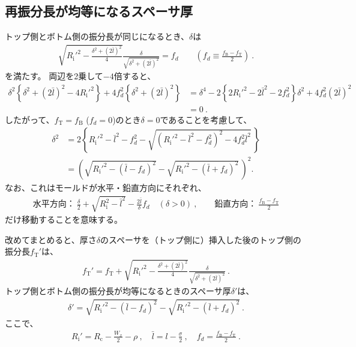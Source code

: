 \subsection{再振分長が均等になるスペーサ厚}
トップ側とボトム側の振分長が同じになるとき、$\delta$は
\begin{align*}
  \sqrt{R_\mathrm i'^2-\frac{\delta^2+(2\bar l)^2}4}\frac\delta{\sqrt{\delta^2+(2\bar l)^2}} = f_d \qquad
  \left(f_d \equiv \frac{f_\mathrm B-f_\mathrm T}2\right)\ .
\end{align*}
を満たす。
両辺を2乗して$-4$倍すると、
\begin{align*}
  \delta^2\left\{\delta^2+(2\bar l)^2-4R_\mathrm i'^2\right\}+4f_d^2\left\{\delta^2+(2\bar l)^2\right\}
  & = \delta^4-2\left\{2R_\mathrm i'^2-2\bar l^2-2f_d^2\right\}\delta^2+4f_d^2(2\bar l)^2\\
  & = 0\ .
\end{align*}
したがって、$f_\mathrm T = f_\mathrm B$ ($f_d = 0$)のとき$\delta = 0$であることを考慮して、
\begin{align*}
  \delta^2
  &= 2\left\{
       R_\mathrm i'^2-\bar l^2-f_d^2-\sqrt{\left(R_\mathrm i'^2-\bar l^2-f_d^2\right)^2-4f_d^2\bar l^2}\,
     \right\}\\
  &= \left(\sqrt{R_\mathrm i'^2-(\bar l-f_d)^2}-\sqrt{R_\mathrm i'^2-(\bar l+f_d)^2}\,\right)^{\!\!2}.
\end{align*}
なお、これはモールドが水平・鉛直方向にそれぞれ、
\begin{align*}
  \text{水平方向：}~\frac\delta2+\sqrt{R_\mathrm i^2-\bar l^2}-\frac{2\bar l}{\delta}f_d\quad(\delta>0)\ , \qquad
  \text{鉛直方向：}~\frac{f_\mathrm B-f_\mathrm T}2
\end{align*}
だけ移動することを意味する。


\begin{hosoku}
改めてまとめると、厚さ$\delta$のスペーサを（トップ側に）挿入した後のトップ側の振分長$f_\mathrm T'$は、
\begin{align*}
  f_\mathrm T'
  = f_\mathrm T+\sqrt{R_\mathrm i'^2-\frac{\delta^2+(2\bar l)^2}4}\frac\delta{\sqrt{\delta^2+(2\bar l)^2}}\ .
\end{align*}
トップ側とボトム側の振分長が均等になるときのスペーサ厚$\delta'$は、
\begin{align*}
  \delta' = \sqrt{R_\mathrm i'^2-(\bar l-f_d)^2}-\sqrt{R_\mathrm i'^2-(\bar l+f_d)^2}\ .
\end{align*}
ここで、
\begin{align*}
  R_\mathrm i' = R_\mathrm c-\frac{W_x}2-\rho\ ,\quad
  \bar l = l-\frac\sigma2\ ,\quad
  f_d = \frac{f_\mathrm B-f_\mathrm T}2\ .
\end{align*}
\end{hosoku}




